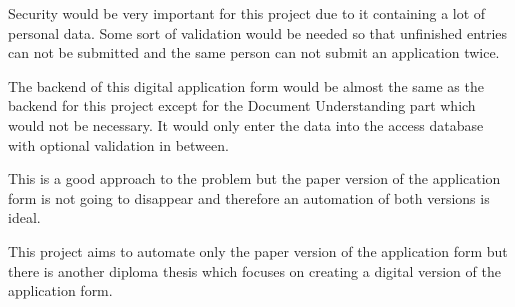 Security would be very important for this project due to it containing a lot of personal data. Some sort of validation would be needed so that unfinished entries can not be submitted and the same person can not submit an application twice.

The backend of this digital application form would be almost the same as the backend for this project except for the Document Understanding part which would not be necessary. It would only enter the data into the access database with optional validation in between.

This is a good approach to the problem but the paper version of the application form is not going to disappear and therefore an automation of both versions is ideal.

This project aims to automate only the paper version of the application form but there is another diploma thesis which focuses on creating a digital version of the application form.
